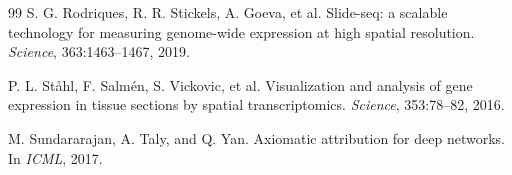\documentclass[11pt]{article}
\begin{document}
\begin{thebibliography}{99}
S. G. Rodriques, R. R. Stickels, A. Goeva, et al.
\newblock Slide-seq: a scalable technology for measuring genome-wide expression
at high spatial resolution.
\newblock \emph{Science}, 363:1463--1467, 2019.

P. L. St\aa hl, F. Salm\'en, S. Vickovic, et al.
\newblock Visualization and analysis of gene expression in tissue sections by
spatial transcriptomics.
\newblock \emph{Science}, 353:78--82, 2016.

M. Sundararajan, A. Taly, and Q. Yan.
\newblock Axiomatic attribution for deep networks.
\newblock In \emph{ICML}, 2017.

\end{thebibliography}
\end{document}
